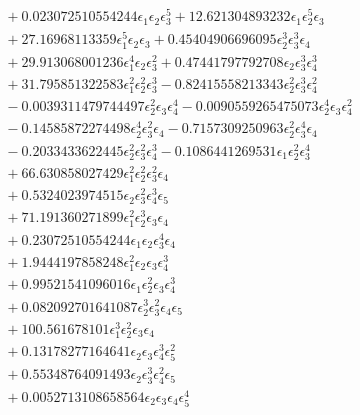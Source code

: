 \documentclass[10pt]{article}
\begin{document}
\begin{align*}
&{}  + 0.023072510554244 \epsilon_{1} \epsilon_{2} \epsilon_{3}^{5} + 12.621304893232 \epsilon_{1} \epsilon_{2}^{5} \epsilon_{3} \\
&{}  + 27.16968113359 \epsilon_{1}^{5} \epsilon_{2} \epsilon_{3} + 0.45404906696095 \epsilon_{2}^{3} \epsilon_{3}^{3} \epsilon_{4} \\
&{}  + 29.913068001236 \epsilon_{1}^{4} \epsilon_{2} \epsilon_{3}^{2} + 0.47441797792708 \epsilon_{2} \epsilon_{3}^{3} \epsilon_{4}^{3} \\
&{}  + 31.795851322583 \epsilon_{1}^{2} \epsilon_{2}^{2} \epsilon_{3}^{3} - 0.82415558213343 \epsilon_{2}^{2} \epsilon_{3}^{3} \epsilon_{4}^{2} \\
&{}  - 0.0039311479744497 \epsilon_{2}^{2} \epsilon_{3} \epsilon_{4}^{4} - 0.0090559265475073 \epsilon_{2}^{4} \epsilon_{3} \epsilon_{4}^{2} \\
&{}  - 0.14585872274498 \epsilon_{2}^{4} \epsilon_{3}^{2} \epsilon_{4} - 0.7157309250963 \epsilon_{2}^{2} \epsilon_{3}^{4} \epsilon_{4} \\
&{}  - 0.2033433622445 \epsilon_{2}^{2} \epsilon_{3}^{2} \epsilon_{4}^{3} - 0.1086441269531 \epsilon_{1} \epsilon_{2}^{2} \epsilon_{3}^{4} \\
&{}  + 66.630858027429 \epsilon_{1}^{2} \epsilon_{2}^{2} \epsilon_{3}^{2} \epsilon_{4} \\
&{}  + 0.5324023974515 \epsilon_{2} \epsilon_{3}^{2} \epsilon_{4}^{3} \epsilon_{5} \\
&{}  + 71.191360271899 \epsilon_{1}^{2} \epsilon_{2}^{3} \epsilon_{3} \epsilon_{4} \\
&{}  + 0.23072510554244 \epsilon_{1} \epsilon_{2} \epsilon_{3}^{4} \epsilon_{4} \\
&{}  + 1.9444197858248 \epsilon_{1}^{2} \epsilon_{2} \epsilon_{3} \epsilon_{4}^{3} \\
&{}  + 0.99521541096016 \epsilon_{1} \epsilon_{2}^{2} \epsilon_{3} \epsilon_{4}^{3} \\
&{}  + 0.082092701641087 \epsilon_{2}^{3} \epsilon_{3}^{2} \epsilon_{4} \epsilon_{5} \\
&{}  + 100.561678101 \epsilon_{1}^{3} \epsilon_{2}^{2} \epsilon_{3} \epsilon_{4} \\
&{}  + 0.13178277164641 \epsilon_{2} \epsilon_{3} \epsilon_{4}^{3} \epsilon_{5}^{2} \\
&{}  + 0.55348764091493 \epsilon_{2} \epsilon_{3}^{3} \epsilon_{4}^{2} \epsilon_{5} \\
&{}  + 0.0052713108658564 \epsilon_{2} \epsilon_{3} \epsilon_{4} \epsilon_{5}^{4} \\

\end{align*}
\end{document}
